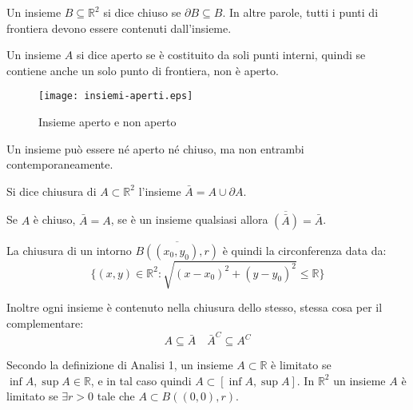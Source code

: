\begin{definition}
	Un insieme $B\subseteq \mathbb{R}^2$ si dice chiuso se $\partial B\subseteq B$. In altre parole, tutti i punti di frontiera devono essere contenuti dall'insieme.
\end{definition}

\begin{definition}
	Un insieme $A$ si dice aperto se è costituito da soli punti interni, quindi se contiene anche un solo punto di frontiera, non è aperto.
	\begin{figure}[h]
		\texttt{[image: insiemi-aperti.eps]}
		\centering
		\caption{Insieme aperto e non aperto}
	\end{figure}
\end{definition}

\begin{observation}
	Un insieme può essere né aperto né chiuso, ma non entrambi contemporaneamente.
\end{observation}

\begin{definition}[Chiusura]
	Si dice chiusura di $A\subset\mathbb{R}^2$ l'insieme $\bar{A}=A\cup\partial A$.
\end{definition}

\begin{observation}
	Se $A$ è chiuso, $\bar{A}=A$, se è un insieme qualsiasi allora $\overline{(\bar{A})}=\bar{A}$.
\end{observation}

La chiusura di un intorno $\overline{B((x_0, y_0), r)}$ è quindi la circonferenza data da:
\begin{equation}
	\{(x, y) \in \mathbb{R}^2 : \sqrt{(x-x_0)^2+(y-y_0)^2}\leq \mathbb{R}\}
\end{equation}

Inoltre ogni insieme è contenuto nella chiusura dello stesso, stessa cosa per il complementare:
\begin{equation}
	A\subseteq\bar{A}\quad \bar{A}^C\subseteq A^C
\end{equation}

\begin{definition}
	Secondo la definizione di Analisi 1, un insieme $A\subset\mathbb{R}$ è limitato se $\inf A ,\sup A \in \mathbb{R}$, e in tal caso quindi $A\subset [\inf A, \sup A]$. In $\mathbb{R}^2$ un insieme $A$ è limitato se $\exists r>0$ tale che $A\subset B((0, 0), r)$. 
\end{definition}

